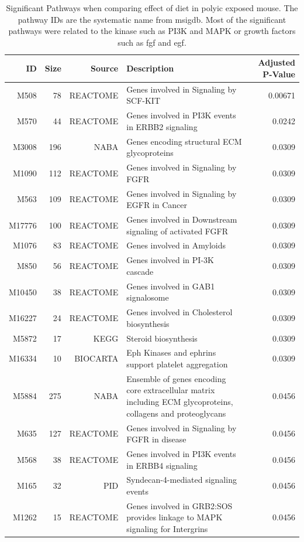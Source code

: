 \begin{landscape}
	\begin{table}
		\begin{tabular}{rrrp{10cm}r}
			\toprule
			ID&	Size&	Source&	Description&	Adjusted P-Value\\
			\midrule
			M508&	78&	REACTOME&	Genes involved in Signaling by SCF-KIT&	0.00671\\
			M570&	44&	REACTOME&	Genes involved in PI3K events in ERBB2 signaling&	0.0242\\
			M3008&	196&	NABA&	Genes encoding structural ECM glycoproteins&	0.0309\\
			M1090&	112&	REACTOME&	Genes involved in Signaling by FGFR&	0.0309\\
			M563&	109&	REACTOME&	Genes involved in Signaling by EGFR in Cancer&	0.0309\\
			M17776&	100&	REACTOME&	Genes involved in Downstream signaling of activated FGFR&	0.0309\\
			M1076&	83&	REACTOME&	Genes involved in Amyloids&	0.0309\\
			M850&	56&	REACTOME&	Genes involved in PI-3K cascade&	0.0309\\
			M10450&	38&	REACTOME&	Genes involved in GAB1 signalosome&	0.0309\\
			M16227&	24&	REACTOME&	Genes involved in Cholesterol biosynthesis&	0.0309\\
			M5872&	17&	KEGG&	Steroid biosynthesis&	0.0309\\
			M16334&	10&	BIOCARTA&	Eph Kinases and ephrins support platelet aggregation&	0.0309\\
			M5884&	275&	NABA&	Ensemble of genes encoding core extracellular matrix including ECM glycoproteins, collagens and proteoglycans&	0.0456\\
			M635&	127&	REACTOME&	Genes involved in Signaling by FGFR in disease&	0.0456\\
			M568&	38&	REACTOME&	Genes involved in PI3K events in ERBB4 signaling&	0.0456\\
			M165&	32&	PID&	Syndecan-4-mediated signaling events&	0.0456\\
			M1262&	15&	REACTOME&	Genes involved in GRB2:SOS provides linkage to MAPK signaling for Intergrins&	0.0456\\
			\bottomrule
		\end{tabular}
		\caption[Significant Pathways When Comparing Effect of Diet in PolyI:C Exposed Mouse]{Significant Pathways when comparing effect of diet in \gls{polyic} exposed mouse.
			The pathway IDs are the systematic name from \gls{msigdb}.
			Most of the significant pathways were related to the kinase such as PI3K and MAPK or growth factors such as \gls{fgf} and \gls{egf}.
			}
			\label{tab:o6polyPath}
	\end{table}
	

\end{landscape}
